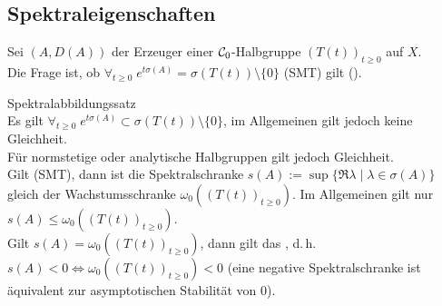 \pagebreak

\subsection{%
    Spektraleigenschaften%
}

\begin{Bem}
    Sei $(A, D(A))$ der Erzeuger einer $\mathcal{C}_0$-Halbgruppe $(T(t))_{t \ge 0}$ auf $X$.\\
    Die Frage ist, ob $\forall_{t \ge 0}\; e^{t \sigma(A)} = \sigma(T(t)) \setminus \{0\}$
    (SMT) gilt ().
\end{Bem}

\begin{Satz}{Spektralabbildungssatz}\\
    Es gilt $\forall_{t \ge 0}\; e^{t \sigma(A)} \subset \sigma(T(t)) \setminus \{0\}$,
    im Allgemeinen gilt jedoch keine Gleichheit.\\
    Für normstetige oder analytische Halbgruppen gilt jedoch Gleichheit.\\
    Gilt (SMT), dann ist die Spektralschranke
    $s(A) := \sup\{\Re \lambda \;|\; \lambda \in \sigma(A)\}$ gleich der Wachstumsschranke
    $\omega_0((T(t))_{t \ge 0})$.
    Im Allgemeinen gilt nur $s(A) \le \omega_0((T(t))_{t \ge 0})$.\\
    Gilt $s(A) = \omega_0((T(t))_{t \ge 0})$, dann gilt das
    , d.\,h.\\
    $s(A) < 0 \iff \omega_0((T(t))_{t \ge 0}) < 0$
    (eine negative Spektralschranke ist äquivalent zur asymptotischen Stabilität von $0$).
\end{Satz}

\pagebreak
